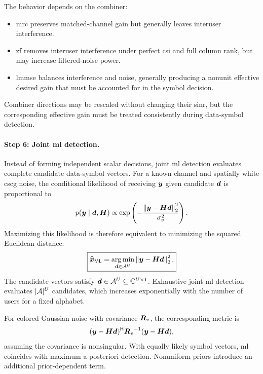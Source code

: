 The behavior depends on the combiner:
\begin{itemize}
	\item \ac{mrc} preserves matched-channel gain but generally leaves interuser interference.
	\item \ac{zf} removes interuser interference under perfect \ac{csi} and full column rank, but may increase filtered-noise power.
	\item \ac{lmmse} balances interference and noise, generally producing a nonunit effective desired gain that must be accounted for in the symbol decision.
\end{itemize}
Combiner directions may be rescaled without changing their \ac{sinr}, but the corresponding effective gain must be treated consistently during data-symbol detection.

\paragraph{Step 6: Joint \ac{ml} detection.}
Instead of forming independent scalar decisions, joint \ac{ml} detection evaluates complete candidate data-symbol vectors. For a known channel and spatially white \ac{cscg} noise, the conditional likelihood of receiving $\bm{y}$ given candidate $\bm{d}$ is proportional to
\begin{equation*}
	p(\bm{y}\mid\bm{d},\bm{H})
	\propto
	\exp\left(
	-\frac{\left\|\bm{y}-\bm{H}\bm{d}\right\|_2^2}{\sigma_v^2}
	\right).
\end{equation*}
Maximizing this likelihood is therefore equivalent to minimizing the squared Euclidean distance:
\begin{equation}
	\boxed{
		\widehat{\bm{x}}_{\mathsf{ML}}
		=\operatorname*{arg\,min}_{\bm{d}\in\mathcal{A}^U}
		\left\|\bm{y}-\bm{H}\bm{d}\right\|_2^2.
	}
	\label{eq06:joint-ml}
\end{equation}
The candidate vectors satisfy $\bm{d}\in\mathcal{A}^U\subseteq\mathbb{C}^{U\times1}$. Exhaustive joint \ac{ml} detection evaluates $|\mathcal{A}|^U$ candidates, which increases exponentially with the number of users for a fixed alphabet.

For colored Gaussian noise with covariance $\bm{R}_v$, the corresponding metric is
\begin{equation*}
	(\bm{y}-\bm{H}\bm{d})^{\mathsf H}
	{\bm{R}_v}^{-1}
	(\bm{y}-\bm{H}\bm{d}),
\end{equation*}
assuming the covariance is nonsingular. With equally likely symbol vectors, \ac{ml} coincides with maximum a posteriori detection. Nonuniform priors introduce an additional prior-dependent term.

